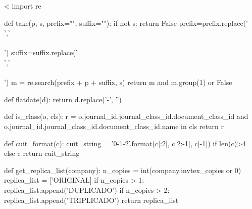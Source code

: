 \documentclass{article}
\begin{document}
<%
    import re

    def take(p, s, prefix="", suffix=""):
        if not s: return False
	prefix=prefix.replace('\\','\\\\')
	suffix=suffix.replace('\\','\\\\')
        m = re.search(prefix + p + suffix, s)
        return m and m.group(1) or False

    def flatdate(d):
        return d.replace('-', '')

    def is_class(o, cls):
        r = o.journal_id.journal_class_id.document_class_id and o.journal_id.journal_class_id.document_class_id.name in cls
        return r

    def cuit_format(c):
	cuit_string = '{0}-{1}-{2}'.format(c[:2], c[2:-1], c[-1]) if len(c)>4 else c
        return cuit_string

    def get_replica_list(company):
        n_copies = int(company.invtex_copies or 0)
	replica_list = ['ORIGINAL]
	if n_copies > 1:
	   replica_list.append('DUPLICADO')
	if n_copies > 2:
	   replica_list.append('TRIPLICADO')
	return replica_list



\end{document}
